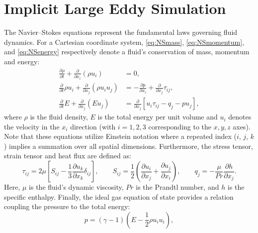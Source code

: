 \documentclass{article}
\begin{document}

\section{Implicit Large Eddy Simulation} \label{sec:appiLES}
The Navier--Stokes equations represent the fundamental laws governing fluid dynamics. For a Cartesian coordinate system, \autoref{eq:NSmass}, \autoref{eq:NSmomentum}, and \autoref{eq:NSenergy} respectively denote a fluid's conservation of mass, momentum and energy:
\begin{align}
    \frac{\partial \rho}{\partial t} + \frac{\partial}{\partial x_i}(\rho u_i) &= 0, \label{eq:NSmass} \\[10pt]
    \frac{\partial}{\partial t} \rho u_i + \frac{\partial}{\partial x_j}(\rho u_i u_j) &= -\frac{\partial p}{\partial x_i} + \frac{\partial}{\partial x_j} \tau_{ij}, \label{eq:NSmomentum} \\[10pt]
    \frac{\partial}{\partial t} E + \frac{\partial}{\partial x_j}(E u_j) &= \frac{\partial}{\partial x_j} \left[ u_i \tau_{ij} - q_j - p u_j \right], \label{eq:NSenergy}
\end{align}
where $\rho$ is the fluid density, $E$ is the total energy per unit volume and $u_i$ denotes the velocity in the $x_i$ direction (with $i = 1,2,3$ corresponding to the $x, y, z$ axes). Note that these equations utilize Einstein notation where a repeated index ($i$, $j$, $k$) implies a summation over all spatial dimensions. Furthermore, the stress tensor, strain tensor and heat flux are defined as: 
\begin{equation}
    \tau_{ij} = 2\mu \left[ S_{ij} - \frac{1}{3} \frac{\partial u_k}{\partial x_k} \delta_{ij} \right], \qquad
    S_{ij} = \frac{1}{2} \left( \frac{\partial u_i}{\partial x_j} + \frac{\partial u_j}{\partial x_i} \right), \qquad
    q_j = -\frac{\mu}{Pr} \frac{\partial h}{\partial x_j}.
    \label{eq:constitutive_relations}
\end{equation}
Here, $\mu$ is the fluid's dynamic viscosity, $Pr$ is the Prandtl number, and $h$ is the specific enthalpy. Finally, the ideal gas equation of state provides a relation coupling the pressure to the total energy:
\begin{equation}
    p = (\gamma - 1) (E - \frac{1}{2} \rho u_i u_i),
\end{equation}
\end{document}
